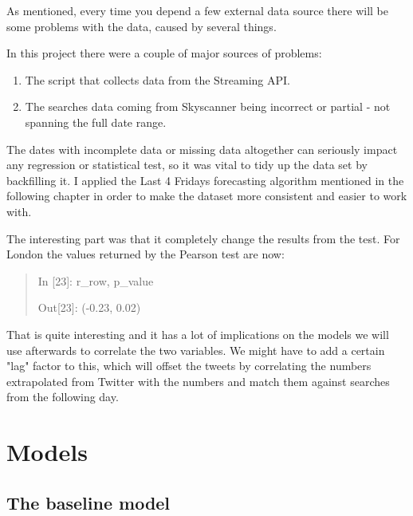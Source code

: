 \documentclass[minf,frontabs,twoside,singlespacing,parskip]{infthesis}
\begin{document}
As mentioned, every time you depend a few external data source there will be some problems with the data, caused by several things. 

In this project there were a couple of major sources of problems:
\begin{enumerate}
\item The script that collects data from the Streaming API.
\item The searches data coming from Skyscanner being incorrect or partial - not spanning the full date range.
\end{enumerate}

The dates with incomplete data or missing data altogether can seriously impact any regression or statistical test, so it was vital to tidy up the data set by backfilling it. I applied the Last 4 Fridays forecasting algorithm mentioned in the following chapter in order to make the dataset more consistent and easier to work with. 

The interesting part was that it completely change the results from the test. For London the values returned by the Pearson test are now:

\begin{quotation}
In [23]: r\_row, p\_value

Out[23]: (-0.23, 0.02)
\end{quotation}

That is quite interesting and it has a lot of implications on the models we will use afterwards to correlate the two variables. 
We might have to add a certain "lag" factor to this, which will offset the tweets by correlating the numbers extrapolated from Twitter with the numbers and match them against searches from the following day.




\chapter{Models}
\label{chap:model}

\section{The baseline model}
\label{sec:baseline}
\end{document}
